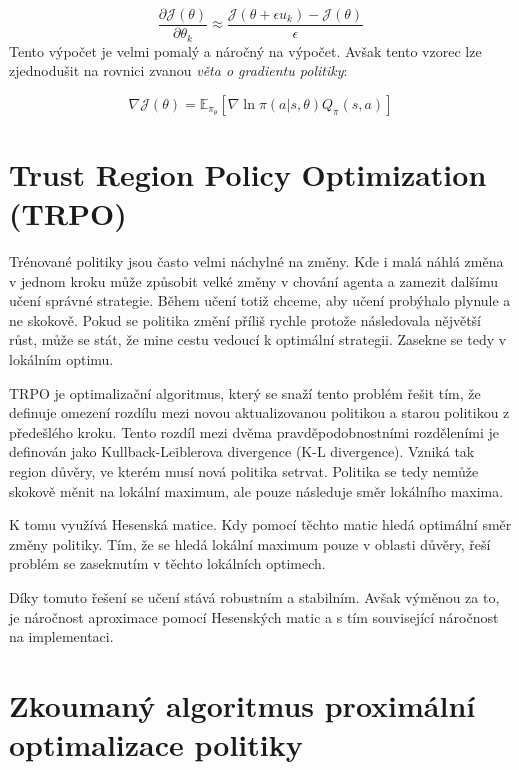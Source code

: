 \begin{equation}
  \label{eq:gradient_politiky}
  \frac{\partial \mathcal{J}(\theta)}{\partial \theta_k} \approx \frac{\mathcal{J}(\theta + \epsilon u_k) - \mathcal{J}(\theta)}{\epsilon}
\end{equation}
Tento výpočet je velmi pomalý a náročný na výpočet.
Avšak tento vzorec lze zjednodušit na rovnici zvanou \emph{věta o gradientu politiky}:

\begin{equation}
    \label{eq:veta_o_gradientu_politiky}
  \nabla \mathcal{J}(\theta) = \mathbb{E}_{\pi_\theta} [\nabla \ln \pi(a \vert s, \theta) Q_\pi(s, a)]
\end{equation}

\section{Trust Region Policy Optimization (TRPO)}\label{sec:trust-region-policy-optimization}
Trénované politiky jsou často velmi náchylné na změny.
Kde i malá náhlá změna v jednom kroku může způsobit velké změny v chování agenta a zamezit dalšímu učení správné strategie.
Během učení totiž chceme, aby učení probýhalo plynule a ne skokově.
Pokud se politika změní příliš rychle protože následovala nějvětší růst, může se stát, že mine cestu vedoucí k optimální strategii.
Zasekne se tedy v lokálním optimu.

TRPO je optimalizační algoritmus, který se snaží tento problém řešit tím, že definuje omezení rozdílu mezi novou aktualizovanou politikou a starou politikou z předešlého kroku.
Tento rozdíl mezi dvěma pravděpodobnostními rozděleními je definován jako Kullback-Leiblerova divergence (K-L divergence)\cite{KL_divergence}.
Vzniká tak region důvěry, ve kterém musí nová politika setrvat.
Politika se tedy nemůže skokově měnit na lokální maximum, ale pouze následuje směr lokálního maxima.

K tomu využívá Hesenská matice.
Kdy pomocí těchto matic hledá optimální směr změny politiky.
Tím, že se hledá lokální maximum pouze v oblasti důvěry, řeší problém se zaseknutím v těchto lokálních optimech.

Díky tomuto řešení se učení stává robustním a stabilním.
Avšak výměnou za to, je náročnost aproximace pomocí Hesenských matic a s tím související náročnost na implementaci.

\section{Zkoumaný algoritmus proximální optimalizace politiky}
\label{sec:proximalni-optimalizace-politiky}

